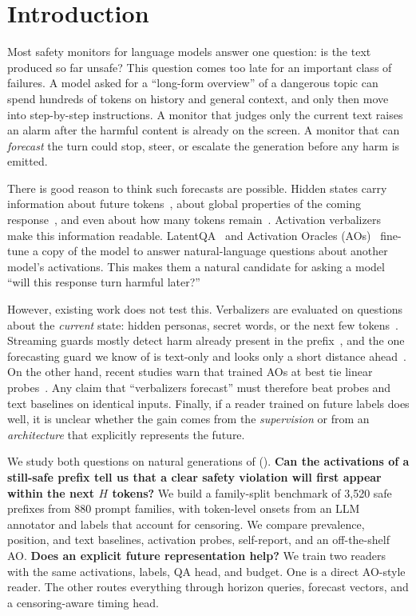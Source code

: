 \section{Introduction}
\label{sec:intro}



Most safety monitors for language models answer one question: is the text produced so far unsafe? This question comes too late for an important class of failures. A model asked for a ``long-form overview'' of a dangerous topic can spend hundreds of tokens on history and general context, and only then move into step-by-step instructions. A monitor that judges only the current text raises an alarm after the harmful content is already on the screen. A monitor that can \emph{forecast} the turn could stop, steer, or escalate the generation before any harm is emitted.

There is good reason to think such forecasts are possible. Hidden states carry information about future tokens~\citep{pal2023futurelens}, about global properties of the coming response~\citep{dong2025emergent}, and even about how many tokens remain~\citep{merzouk2026remaining}. Activation verbalizers make this information readable. LatentQA~\citep{pan2024latentqa} and Activation Oracles (AOs)~\citep{karvonen2025activation} fine-tune a copy of the model to answer natural-language questions about another model's activations. This makes them a natural candidate for asking a model ``will this response turn harmful later?''

However, existing work does not test this. Verbalizers are evaluated on questions about the \emph{current} state: hidden personas, secret words, or the next few tokens~\citep{karvonen2025activation,bauer2026building}. Streaming guards mostly detect harm already present in the prefix~\citep{li2025judgment,sharma2025constitutional}, and the one forecasting guard we know of is text-only and looks only a short distance ahead~\citep{kavumba2026predict}. On the other hand, recent studies warn that trained AOs at best tie linear probes~\citep{bauer2026building}. Any claim that ``verbalizers forecast'' must therefore beat probes and text baselines on identical inputs. Finally, if a reader trained on future labels does well, it is unclear whether the gain comes from the \emph{supervision} or from an \emph{architecture} that explicitly represents the future.

We study both questions on natural generations of \qwen (). {\bf Can the activations of a still-safe prefix tell us that a clear safety violation will first appear within the next $H$ tokens?} We build a family-split benchmark of 3,520 safe prefixes from 880 prompt families, with token-level onsets from an LLM annotator and labels that account for censoring. We compare prevalence, position, and text baselines, activation probes, \qwen self-report, and an off-the-shelf AO. {\bf Does an explicit future representation help?} We train two readers with the same activations, labels, QA head, and budget. One is a direct AO-style reader. The other routes everything through horizon queries, forecast vectors, and a censoring-aware timing head.

